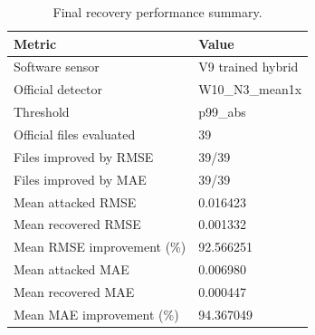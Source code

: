 \begin{table}[t]
\centering
\caption{Final recovery performance summary.}
\label{tab:phase6_overall_metrics}
\begin{tabular}{ll}
\hline
Metric & Value \\
\hline
Software sensor & V9 trained hybrid \\
Official detector & W10\_N3\_mean1x \\
Threshold & p99\_abs \\
Official files evaluated & 39 \\
Files improved by RMSE & 39/39 \\
Files improved by MAE & 39/39 \\
Mean attacked RMSE & 0.016423 \\
Mean recovered RMSE & 0.001332 \\
Mean RMSE improvement (\%) & 92.566251 \\
Mean attacked MAE & 0.006980 \\
Mean recovered MAE & 0.000447 \\
Mean MAE improvement (\%) & 94.367049 \\
\hline
\end{tabular}
\end{table}
